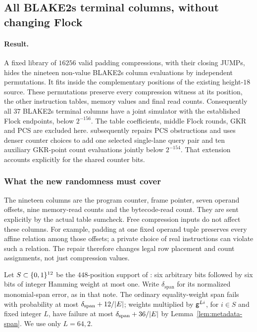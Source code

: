 \subsection{All BLAKE2s terminal columns, without changing Flock}\label{note:zk-flock-columns}

\paragraph{Result.} A fixed library of $16256$ valid padding compressions, with their closing JUMPs, hides the nineteen non-value BLAKE2s column evaluations by independent permutations. It fits inside the complementary positions of the existing height-$18$ source. These permutations preserve every compression witness at its position, the other instruction tables, memory values and final read counts. Consequently all $37$ BLAKE2s terminal columns have a joint simulator with the established Flock endpoints, below $2^{-156}$. The table coefficients, middle Flock rounds, GKR and PCS are excluded here.  subsequently repairs PCS obstructions and uses denser counter choices to add one selected single-lane query pair and ten auxiliary GKR-point count evaluations jointly below $2^{-154}$. That extension accounts explicitly for the shared counter bits.

\subsubsection{What the new randomness must cover}

The nineteen columns are the program counter, frame pointer, seven operand offsets, nine memory-read counts and the bytecode-read count. They are sent explicitly by the actual table sumcheck. Free compression inputs do not affect these columns. For example, padding at one fixed operand tuple preserves every affine relation among those offsets; a private choice of real instructions can violate such a relation. The repair therefore changes legal row placement and count assignments, not just compression values.

Let $S\subset\{0,1\}^{12}$ be the $448$-position support of : six arbitrary bits followed by six bits of integer Hamming weight at most one. Write $\delta_{\mathrm{span}}$ for its normalized monomial-span error, as in that note. The ordinary equality-weight span fails with probability at most $\delta_{\mathrm{span}}+12/|E|$; weights multiplied by $\mathsf{g}^{Li}$, for $i\in S$ and fixed integer $L$, have failure at most $\delta_{\mathrm{span}}+36/|E|$ by Lemma~\ref{lem:metadata-span}. We use only $L=64,2$.

